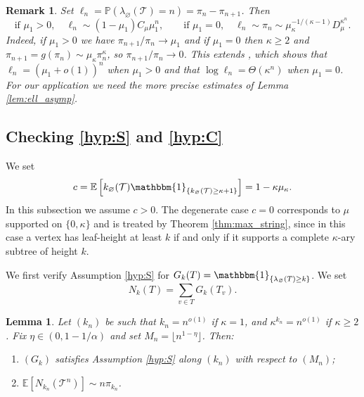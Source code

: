 \documentclass[a4paper,11pt]{article}
\newtheorem{lemma}[theorem]{Lemma}
\newtheorem{remark}[theorem]{Remark}
\newcommand{\E}{\mathbb{E}}
\DeclareRobustCommand{\P}{\mathbb{P}}
\DeclareRobustCommand{\1}{\mathbf{1}}
\begin{document}
\begin{remark}
  Set $
    \ell_n=\P(\lambda_\varnothing(\mathcal T)=n)
    =
    \pi_n-\pi_{n+1}$. Then 
    $$
  \textrm{if } \mu_{1}>0, \quad  \ell_n
    \sim
    (1-\mu_1)C_\mu\mu_1^n,  \qquad \textrm{if } \mu_{1}=0,  \quad   \ell_n
    \sim
    \pi_n
    \sim
    \mu_\kappa^{-1/(\kappa-1)}D_\mu^{\kappa^n}.
  $$
  Indeed, if $\mu_{1}>0$ we have $\pi_{n+1}/\pi_n\to\mu_1$ and if $\mu_{1}=0$ then  $\kappa\ge2$ and
  $\pi_{n+1}=g(\pi_n)\sim
  \mu_\kappa\pi_n^\kappa$, so
  $\pi_{n+1}/\pi_n\to0$.  This extends \cite[Lemma 9]{DGZ23}, which shows that  $\ell_n= (\mu_{1}+o(1))^{n}$ when $\mu_{1}>0$ and that $\log \ell_{n}=\Theta (\kappa^{n})$ when $\mu_{1}=0$. For our application we need the more precise estimates of Lemma \ref{lem:ell_asymp}.
\end{remark}

\subsection{Checking \ref{hyp:S} and \ref{hyp:C}}

We set
$$
  c
  =
  \E\left[
    k_\varnothing(\mathcal T)
    \mathbbm{1}_{\{k_\varnothing(\mathcal T)\ge\kappa+1\}}
  \right]
  =
  1-\kappa\mu_\kappa.
$$
In this subsection we assume $c>0$. The degenerate case $c=0$ corresponds to
$\mu$ supported on $\{0,\kappa\}$ and is treated by Theorem \ref{thm:max_string}, since in this case a
  vertex has leaf-height at least $k$ if and only if it supports a complete
  $\kappa$-ary subtree of height $k$.

  
  
We first verify Assumption \ref{hyp:S} for
$G_k(T)=\mathbbm{1}_{\{\lambda_\varnothing(T)\ge k\}}$. We set
$$
  N_k(T)=\sum_{v\in T}G_k(T_v).
$$

\begin{lemma}
\label{lem:S_lh}
Let $(k_n)$ be such that $k_n=n^{o(1)}$ if $\kappa=1$, and
$\kappa^{k_n}=n^{o(1)}$ if $\kappa\ge2$. Fix
$\eta\in(0,1-1/\alpha)$ and set
$M_n=\lfloor n^{1-\eta}\rfloor$. Then:
\begin{enumerate}
\item[(i)] $(G_k)$ satisfies Assumption \ref{hyp:S} along $(k_n)$ with
respect to $(M_n)$;
\item[(ii)] $\E[N_{k_n}(\mathcal T^n)]\sim n\pi_{k_n}$.
\end{enumerate}
\end{lemma}
\end{document}
